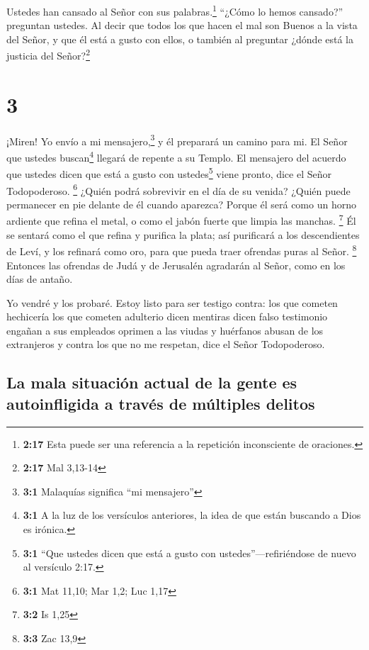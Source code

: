  Ustedes han cansado al Señor con sus
palabras.\footnote{\textbf{2:17} Esta puede ser una referencia a la
  repetición inconsciente de oraciones.} ``¿Cómo lo hemos cansado?''
preguntan ustedes. Al decir que todos los que hacen el mal son Buenos a
la vista del Señor, y que él está a gusto con ellos, o también al
preguntar ¿dónde está la justicia del Señor?\footnote{\textbf{2:17} Mal
  3,13-14}

\hypertarget{section-2}{%
\section{3}\label{section-2}}

 ¡Miren! Yo envío a mi mensajero,\footnote{\textbf{3:1}
  Malaquías significa ``mi mensajero''} y él preparará un camino para
mi. El Señor que ustedes buscan\footnote{\textbf{3:1} A la luz de los
  versículos anteriores, la idea de que están buscando a Dios es
  irónica.} llegará de repente a su Templo. El mensajero del acuerdo que
ustedes dicen que está a gusto con ustedes\footnote{\textbf{3:1} ``Que
  ustedes dicen que está a gusto con ustedes''---refiriéndose de nuevo
  al versículo 2:17.} viene pronto, dice el Señor Todopoderoso.
\footnote{\textbf{3:1} Mat 11,10; Mar 1,2; Luc 1,17} 
¿Quién podrá sobrevivir en el día de su venida? ¿Quién puede permanecer
en pie delante de él cuando aparezca? Porque él será como un horno
ardiente que refina el metal, o como el jabón fuerte que limpia las
manchas. \footnote{\textbf{3:2} Is 1,25}  Él se sentará
como el que refina y purifica la plata; así purificará a los
descendientes de Leví, y los refinará como oro, para que pueda traer
ofrendas puras al Señor. \footnote{\textbf{3:3} Zac 13,9} 
Entonces las ofrendas de Judá y de Jerusalén agradarán al Señor, como en
los días de antaño.

 Yo vendré y los probaré. Estoy listo para ser testigo
contra: los que cometen hechicería los que cometen adulterio dicen
mentiras dicen falso testimonio engañan a sus empleados oprimen a las
viudas y huérfanos abusan de los extranjeros y contra los que no me
respetan, dice el Señor Todopoderoso.

\hypertarget{la-mala-situaciuxf3n-actual-de-la-gente-es-autoinfligida-a-travuxe9s-de-muxfaltiples-delitos}{%
\subsection{La mala situación actual de la gente es autoinfligida a
través de múltiples
delitos}\label{la-mala-situaciuxf3n-actual-de-la-gente-es-autoinfligida-a-travuxe9s-de-muxfaltiples-delitos}}

